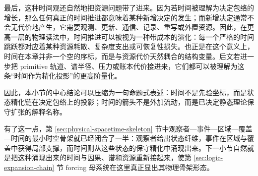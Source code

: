 最后，这种时间观还自然地把资源问题带了进来。因为若时间被理解为决定包络的增长，那么任何真正的时间推进都意味着某种新增决定的发生；而新增决定通常不会无代价地产生，它需要观测、更新、通信、记录、重写或外置资源。因此，在更高一层的物理读法中，时间推进可以被视为一种带成本的演化：每一个严格的时间跳跃都对应着某种资源耗散、复杂度支出或可恢复性损失。也正是在这个意义上，时间在本章并非一个空的序标，而是与资源代价天然耦合的结构变量。后文若进一步把 primitive 轨道、谱半径、压力或账本代价接进来，它们都可以被理解为这条“时间作为精化投影”的更高阶量化。

因此，本小节的中心结论可以压缩为一句命题式表述：时间不是先验坐标，而是状态精化链在决定包络上的投影；时间的箭头不是外加流动，而是已决定静态理论保守扩张的解释名称。

有了这一点，第 \ref{sec:physical-spacetime-skeleton} 节中观察者—事件—区域—覆盖—时间的最小时空骨架就已经闭合了一半：观察者给出状态纤维，事件在区域与覆盖中获得局部支撑，而时间则从这些状态的保守精化中涌现出来。下一小节自然就是把这种涌现出来的时间与因果、谱和资源重新接起来，使第 \ref{sec:logic-expansion-chain} 节 forcing 母系统在这里真正显出其物理骨架形态。
